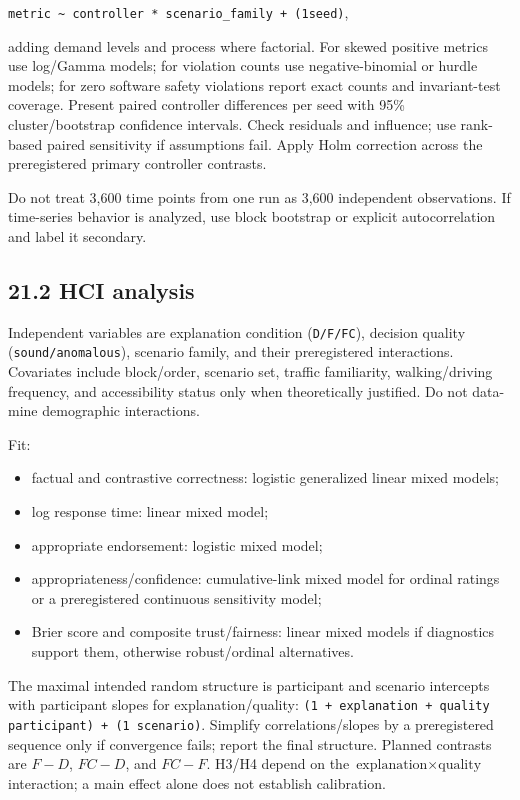 \documentclass[
  english,
  11pt,
  a4paper,
]{article}
\providecommand{\tightlist}{%
  \setlength{\itemsep}{0pt}\setlength{\parskip}{0pt}}
\begin{document}
\texttt{metric\ \textasciitilde{}\ controller\ *\ scenario\_family\ +\ (1\textbar{}seed)},

adding demand levels and process where factorial. For skewed positive
metrics use log/Gamma models; for violation counts use negative-binomial
or hurdle models; for zero software safety violations report exact
counts and invariant-test coverage. Present paired controller
differences per seed with 95\% cluster/bootstrap confidence intervals.
Check residuals and influence; use rank-based paired sensitivity if
assumptions fail. Apply Holm correction across the preregistered primary
controller contrasts.

Do not treat 3,600 time points from one run as 3,600 independent
observations. If time-series behavior is analyzed, use block bootstrap
or explicit autocorrelation and label it secondary.

\subsection{21.2 HCI analysis}\label{hci-analysis}

Independent variables are explanation condition (\texttt{D/F/FC}),
decision quality (\texttt{sound/anomalous}), scenario family, and their
preregistered interactions. Covariates include block/order, scenario
set, traffic familiarity, walking/driving frequency, and accessibility
status only when theoretically justified. Do not data-mine demographic
interactions.

Fit:

\begin{itemize}
\tightlist
\item
  factual and contrastive correctness: logistic generalized linear mixed
  models;
\item
  log response time: linear mixed model;
\item
  appropriate endorsement: logistic mixed model;
\item
  appropriateness/confidence: cumulative-link mixed model for ordinal
  ratings or a preregistered continuous sensitivity model;
\item
  Brier score and composite trust/fairness: linear mixed models if
  diagnostics support them, otherwise robust/ordinal alternatives.
\end{itemize}

The maximal intended random structure is participant and scenario
intercepts with participant slopes for explanation/quality:
\texttt{(1 + explanation + quality \textbar{} participant) +
(1 \textbar{} scenario)}. Simplify correlations/slopes by a preregistered
sequence only if convergence fails; report the final structure. Planned
contrasts are \(F-D\), \(FC-D\), and \(FC-F\). H3/H4 depend on the
\(\text{explanation}\times\text{quality}\) interaction; a main effect
alone does not establish calibration.
\end{document}
